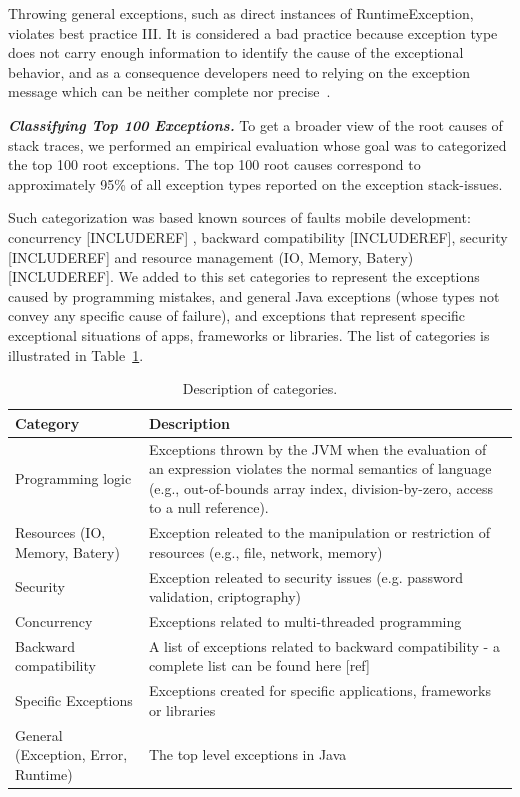 \documentclass[conference]{IEEEtran}
\begin{document}
Throwing general exceptions, such as direct instances of RuntimeException, violates best
practice III. It is considered a bad practice because exception type does not carry enough
 information to identify the cause of the exceptional behavior, and as a consequence developers need to relying on
the exception message which can be neither complete nor precise~\cite{gosling2000java}.

\emph{\textbf{Classifying Top 100 Exceptions.}} To get a broader view of the root causes of stack traces,
 we performed an empirical evaluation
whose goal was to categorized the top 100 root exceptions. The top 100 root causes correspond 
to approximately 95\% of all exception types reported on the exception stack-issues. 

Such categorization was based known sources of faults mobile development: concurrency [INCLUDEREF]
, backward compatibility  [INCLUDEREF], security   [INCLUDEREF] and resource management (IO, Memory, Batery)  [INCLUDEREF].
We added to this set categories to represent the exceptions caused by programming mistakes,
 and general Java exceptions (whose types not convey any specific cause of failure), and 
exceptions that represent specific  exceptional situations of apps, frameworks or libraries.
The list of categories is illustrated in Table~\ref{tab:categories}. 

\begin{table}
  \centering
  \begin{tabular}{|p{2cm}| p{5cm}|}
    \hline
    \bfseries{Category} & \bfseries{Description} \\
    \hline
      Programming logic &  Exceptions thrown by the JVM when the 
evaluation of an expression violates the normal semantics of language (e.g., 
out-of-bounds array index, division-by-zero, access to a null reference). \\ \hline
      Resources (IO, Memory, Batery)  & Exception releated to the manipulation or restriction of resources (e.g., file, network, memory) \\ \hline
      Security                               & Exception releated to security issues (e.g. password validation, criptography) \\ \hline
      Concurrency                            & Exceptions related to multi-threaded programming \\ \hline
      Backward compatibility                 &  A list of exceptions related to backward compatibility - a complete list can be found here [ref]  \\ \hline
      Specific Exceptions              & Exceptions created for specific applications, frameworks or libraries \\ \hline
      General (Exception, Error, Runtime)    & The top level exceptions in Java    \\ \hline
    \hline
  \end{tabular}
  \caption{Description of categories.}
  \label{tab:categories}
\end{table}
\end{document}
